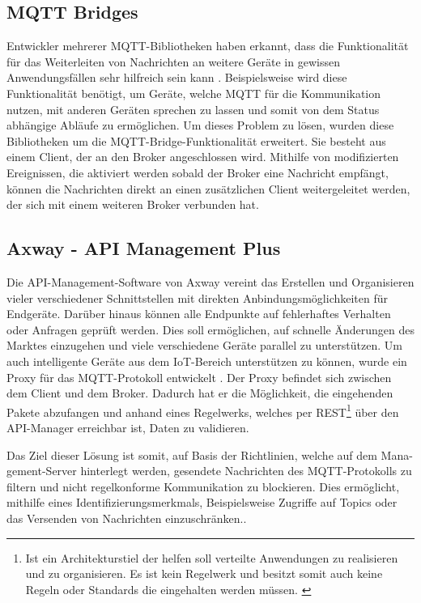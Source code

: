     \subsection{MQTT Bridges}
        Entwickler mehrerer MQTT-Bibliotheken haben erkannt, dass die Funktionalität für das Weiterleiten von Nachrichten an weitere Geräte in gewissen Anwendungsfällen sehr hilfreich sein kann \cite{84codes_ab_2016,light_2019}. Beispielsweise wird diese Funktionalität benötigt, um Geräte, welche \ac{MQTT} für die Kommunikation nutzen, mit anderen Geräten sprechen zu lassen und somit von dem Status abhängige Abläufe zu ermöglichen.
        Um dieses Problem zu lösen, wurden diese Bibliotheken um die MQTT-Bridge-Funktionalität erweitert. Sie besteht aus einem Client, der an den Broker angeschlossen wird. Mithilfe von modifizierten Ereignissen, die aktiviert werden sobald der Broker eine Nachricht empfängt, können die Nachrichten direkt an einen zusätzlichen Client weitergeleitet werden, der sich mit einem weiteren Broker verbunden hat.
    
    \subsection{Axway - API Management Plus}
        Die API-Management-Software von Axway vereint das Erstellen und Organisieren vieler verschiedener Schnittstellen mit direkten Anbindungsmöglichkeiten für Endgeräte. Darüber hinaus können alle Endpunkte auf fehlerhaftes Verhalten oder Anfragen geprüft werden. Dies soll ermöglichen, auf schnelle Änderungen des Marktes einzugehen und viele verschiedene Geräte parallel zu unterstützen.
        Um auch intelligente Geräte aus dem \ac{IoT}-Bereich unterstützen zu können, wurde ein Proxy für das \ac{MQTT}-Protokoll entwickelt \cite{axway_2018}. Der Proxy befindet sich zwischen dem Client und dem Broker. Dadurch hat er die Möglichkeit, die eingehenden Pakete abzufangen und anhand eines Regelwerks, welches per \ac{REST}\footnote{Ist ein Architekturstiel der helfen soll verteilte Anwendungen zu realisieren und zu organisieren. Es ist kein Regelwerk und besitzt somit auch keine Regeln oder Standards die eingehalten werden müssen. \cite{Doglio2015}} über den \acs{API}-Manager erreichbar ist, Daten zu validieren.
        
        Das Ziel dieser Lösung ist somit, auf Basis der Richtlinien, welche auf dem Mana-gement-Server hinterlegt werden, gesendete Nachrichten des \ac{MQTT}-Protokolls zu filtern und nicht regelkonforme Kommunikation zu blockieren. Dies ermöglicht, mithilfe eines Identifizierungsmerkmals, Beispielsweise Zugriffe auf Topics oder das Versenden von Nachrichten einzuschränken..
        
